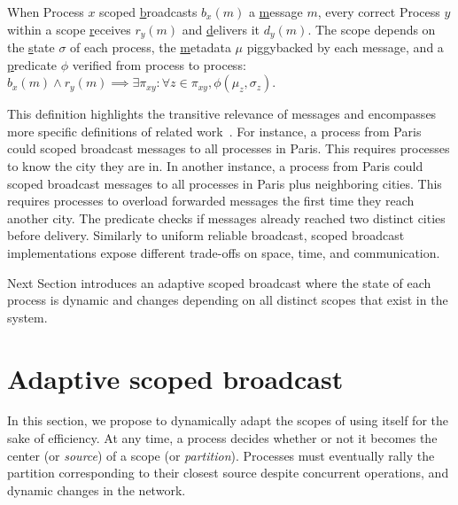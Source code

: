 
\begin{definition}
  When Process $x$ scoped \underline{b}roadcasts $b_x(m)$ a
  \underline{m}essage $m$, every correct Process $y$ within a scope
  \underline{r}eceives $r_y(m)$ and \underline{d}elivers it
  $d_y(m)$. The scope depends on the \underline{s}tate $\sigma$ of
  each process, the \underline{m}etadata $\mu$ piggybacked by each
  message, and a \underline{p}redicate $\phi$ verified from process to
  process: $b_x(m) \wedge r_y(m) \implies \exists \pi_{xy}: \forall z
  \in \pi_{xy}, \phi(\mu_z, \sigma_z)$.
\end{definition}

This definition highlights the transitive relevance of messages and
encompasses more specific definitions of related
work~\cite{hsiao2005scoped, lue2006scoped, wang2015prodiluvian}. For
instance, a process from Paris could scoped broadcast messages to all
processes in Paris. This requires processes to know the city they are
in. In another instance, a process from Paris could scoped broadcast
messages to all processes in Paris plus neighboring cities. This
requires processes to overload forwarded messages the first time they
reach another city. The predicate checks if messages already reached
two distinct cities before delivery. Similarly to uniform reliable
broadcast, scoped broadcast implementations expose different
trade-offs on space, time, and communication.

Next Section introduces an adaptive scoped broadcast where the state
of each process is dynamic and changes depending on all distinct
scopes that exist in the system.



\section{Adaptive scoped broadcast}
\label{sec:adaptive}

In this section, we propose to dynamically adapt the scopes of \NAMEB
using \NAMEB itself for the sake of efficiency.  At any time, a
process decides whether or not it becomes the center (or
\emph{source}) of a scope (or \emph{partition}). Processes must
eventually rally the partition corresponding to their closest source
despite concurrent operations, and dynamic changes in the network.

